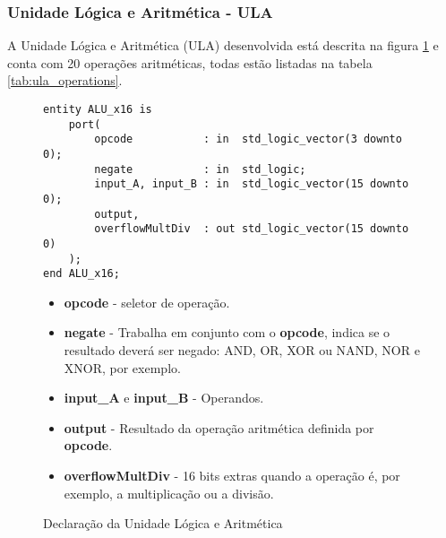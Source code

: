 \documentclass{article}
\newcommand\tab[1][0.50cm]{\hspace*{#1}}
\begin{document}
			\subsubsection[ULA]{Unidade L\'{o}gica e Aritm\'{e}tica - ULA}
				\tab A Unidade L\'{o}gica e Aritm\'{e}tica (ULA) desenvolvida est\'{a} descrita na figura \ref{fig:ALU_x16} e conta com 20 opera\c{c}\~{o}es aritm\'{e}ticas, todas est\~{a}o listadas na tabela \ref{tab:ula_operations}.
				\begin{figure}[H]
					\centering
					\caption[ULA]{Declara\c{c}\~{a}o da Unidade L\'{o}gica e Aritm\'{e}tica}
					\label{fig:ALU_x16}
					\begin{lstlisting}[style=vhdl]
entity ALU_x16 is 
	port(
		opcode 			 : in  std_logic_vector(3 downto 0);
		negate 			 : in  std_logic;
		input_A, input_B : in  std_logic_vector(15 downto 0);
		output, 
		overflowMultDiv  : out std_logic_vector(15 downto 0)
	);	
end ALU_x16;
					\end{lstlisting}
					\begin{itemize}
						\item \textbf{opcode} - seletor de opera\c{c}\~{a}o.
						\item \textbf{negate} - Trabalha em conjunto com o \textbf{opcode}, indica se o resultado dever\'{a}  ser negado: AND, OR, XOR ou NAND, NOR e XNOR, por exemplo.
						\item \textbf{input\_A} e \textbf{input\_B} - Operandos.
						\item \textbf{output} - Resultado da opera\c{c}\~{a}o aritm\'{e}tica definida por \textbf{opcode}.
						\item \textbf{overflowMultDiv} - 16 bits extras quando a opera\c{c}\~{a}o \'{e}, por exemplo, a multiplica\c{c}\~{a}o ou a divis\~{a}o.
					\end{itemize}
				\end{figure}
\end{document}
